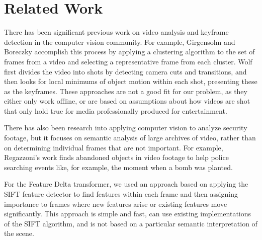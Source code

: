 \section{Related Work}
\label{sec:related}

There has been significant previous work on video analysis and keyframe
detection in the computer vision community. For example, Girgensohn and
Boreczky \cite{related1} accomplish this process by applying a clustering
algorithm to the set of frames from a video and selecting a representative
frame from each cluster. Wolf \cite{related2} first divides the video into shots by detecting 
camera cuts and transitions, and then looks for local minimums of object motion
within each shot, presenting these as the keyframes. These approaches are
not a good fit for our problem, as they either only work offline, or are based
on assumptions about how videos are shot that only hold true for media
professionally produced for entertainment. 

There has also been research into applying computer vision to analyze
security footage, but it focuses on semantic analysis of large archives of
video, rather than on determining individual frames that are not important.
For example, Regazzoni’s work \cite{related3} finds abandoned objects in
video footage to help police searching events like, for example, the moment
when a bomb was planted. 

For the Feature Delta transformer, we used an approach based on applying
the SIFT feature detector \cite{related4} to find features within each frame
and then assigning importance to frames where new features arise
or existing features move significantly. This approach is simple and fast,
can use existing implementations of the SIFT algorithm, and is
not based on a particular semantic interpretation of the scene.


